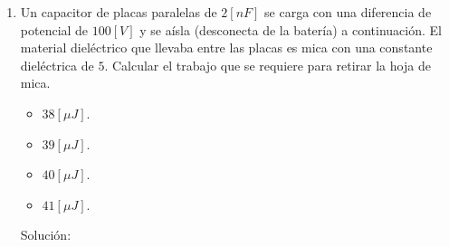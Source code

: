 \documentclass[letter,11pt]{article}
\begin{document}
\begin{enumerate}
\item Un capacitor de placas paralelas de $2 [nF]$ se carga con una diferencia
de potencial de $100 [V]$ y se aísla (desconecta de la batería) a continuación.
El material dieléctrico que llevaba entre las placas es mica con una constante
dieléctrica de $5$. Calcular el trabajo que se requiere para retirar la hoja de
mica.

\begin{itemize}
    \item $38 [\mu J]$.
    \item $39 [\mu J]$.
    \item $40 [\mu J]$.
    \item $41 [\mu J]$.
\end{itemize}

Solución: \\

\end{enumerate}
\end{document}
